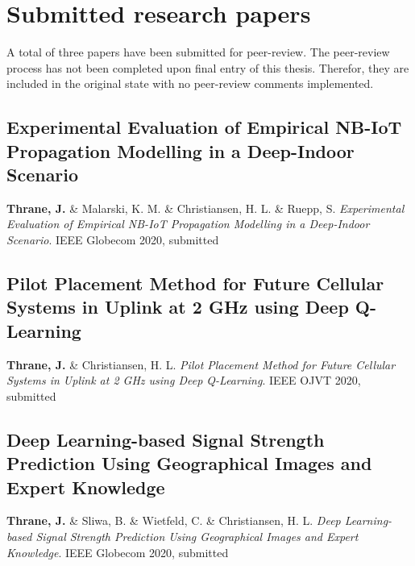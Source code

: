 \chapter{Submitted research papers}\label{app:submitted_papers}

A total of three papers have been submitted for peer-review. The peer-review process has not been completed upon final entry of this thesis. Therefor, they are included in the original state with no peer-review comments implemented.

\section{Experimental Evaluation of Empirical NB-IoT Propagation Modelling in a Deep-Indoor Scenario}
\noindent \textbf{Thrane, J.} \&  Malarski, K. M. \& Christiansen, H. L. \& Ruepp, S. \textit{Experimental Evaluation of Empirical NB-IoT Propagation Modelling in a Deep-Indoor Scenario}. IEEE Globecom 2020, submitted \cite{Thrane2020ExperimentalScenario} 




\section{Pilot Placement Method for Future Cellular Systems in Uplink at 2 GHz using Deep Q-Learning}
\noindent \textbf{Thrane, J.} \& Christiansen, H. L. \textit{Pilot Placement Method for Future Cellular Systems in Uplink at 2 GHz using Deep Q-Learning}. IEEE OJVT 2020, submitted \cite{Thrane2020PilotQ-Learning} 





\section{Deep Learning-based Signal Strength Prediction Using Geographical Images and Expert Knowledge}
\noindent \textbf{Thrane, J.} \&  Sliwa, B. \& Wietfeld, C. \& Christiansen, H. L. \textit{Deep Learning-based Signal Strength Prediction Using Geographical Images and Expert Knowledge}. IEEE Globecom 2020, submitted \cite{Thrane2020DeepKnowledge}
